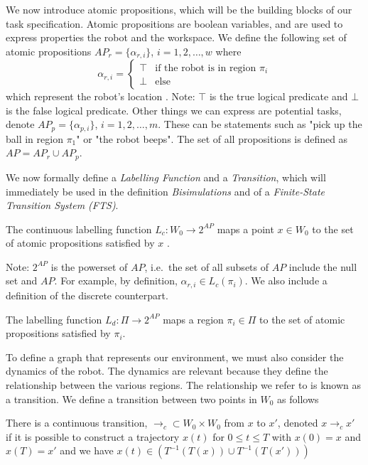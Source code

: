 We now introduce atomic propositions, which will be the building blocks of our task specification. Atomic propositions are boolean variables, and are used to express properties the robot and the workspace. We define the following set of atomic propositions $AP_r = \{\alpha_{r,i}\}$, $i=1,2,\dots,w$ where 
\[\alpha_{r,i} =  \begin{cases}
\top & \text{if the robot is in region $\pi_i$} \\
\bot & \text{else}
\end{cases}
\]
which represent the robot's location \cite{guo15}. Note: $\top$ is the true logical predicate and $\bot$ is the false logical predicate. Other things we can express are potential tasks, denote $AP_p = \{\alpha_{p,i}\}$, $i=1,2,\dots,m$. These can be statements such as "pick up the ball in region $\pi_1$" or "the robot beeps". The set of all propositions is defined as $AP = AP_r \cup AP_p$.

We now formally define a \textit{Labelling Function} and a \textit{Transition}, which will immediately be used in the definition \textit{Bisimulations} and of a \textit{Finite-State Transition System (FTS)}. 
\theoremstyle{definition}
\begin{definition}
\label{defCLF}
The continuous labelling function $L_c:W_0 \rightarrow 2^{AP}$ maps a point $x \in W_0$ to the set of atomic propositions satisfied by $x$ \cite{guo15}.
\end{definition} 
Note: $2^{AP}$ is the powerset of $AP$, i.e.\ the set of all subsets of $AP$ include the null set and $AP$. For example, by definition, $\alpha_{r,i} \in L_c(\pi_i)$. 
We also include a definition of the discrete counterpart. 

\theoremstyle{definition}
\begin{definition}
\label{defDLF}
The labelling function $L_d:\Pi\rightarrow 2^{AP}$ maps a region $\pi_i \in \Pi$ to the set of atomic propositions satisfied by $\pi_i$.
\end{definition} 


To define a graph that represents our environment, we must also consider the dynamics of the robot. The dynamics are relevant because they define the relationship between the various regions. The relationship we refer to is known as a transition. We define a transition between two points in $W_0$ as follows
\theoremstyle{definition}
\begin{definition}
\label{defCTransition}
There is a continuous transition, $\rightarrow_c \subset W_0 \times W_0$ from $x$ to $x'$, denoted $x \rightarrow_c x'$ if it is possible to construct a trajectory $x(t)$ for $0 \leq t \leq T$ with $x(0)=x$ and $x(T) =x'$ and we have $x(t) \in (T^{-1}(T(x))\cup T^{-1}(T(x')))$ \cite{fainekos09}
\end{definition}

